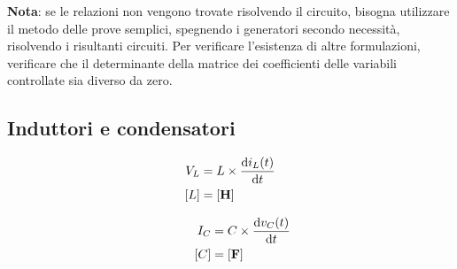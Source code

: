 \documentclass[10pt]{article}
\newcommand{\unit}[1]{\left[\mathbf{#1}\right]}
\begin{document}
        \medskip

        \textbf{Nota}: se le relazioni non vengono trovate risolvendo il circuito, bisogna utilizzare il metodo delle
        prove semplici, spegnendo i generatori secondo necessità, risolvendo i risultanti circuiti. Per verificare
        l'esistenza di altre formulazioni, verificare che il determinante della matrice dei coefficienti delle
        variabili controllate sia diverso da zero.

    \vspace{-\baselineskip}
    \subsection*{Induttori e condensatori}

        \begin{minipage}[t]{.03\textwidth}
            \vspace{-\baselineskip}
            
            

        \end{minipage}
        \begin{minipage}[t]{.2\textwidth}
            \vspace{-\baselineskip}
            
            \begin{align*}
                V_L &= L \times \dv{i_L (t)}{t}\\
                [L] &= \unit{H}
            \end{align*}

        \end{minipage}
        \begin{minipage}[t]{.03\textwidth}
            \vspace{-\baselineskip}
            
            

        \end{minipage}
        \begin{minipage}[t]{.2\textwidth}
            \vspace{-\baselineskip}
            
            \begin{align*}
                \qquad I_C &= C \times \dv{v_C (t)}{t}\\
                \qquad [C] &= \unit{F}\\
            \end{align*}

        \end{minipage}
\end{document}
